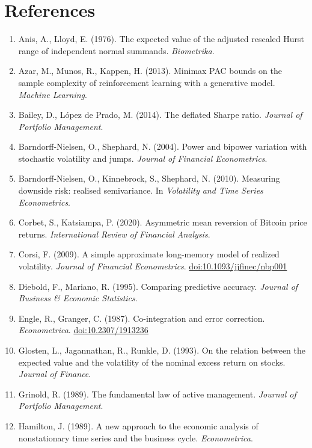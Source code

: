 \documentclass[11pt,a4paper]{article}
\theoremstyle{definition}
\begin{document}
\section*{References}
\small
\begin{enumerate}[leftmargin=18pt,itemsep=1pt]
\item Anis, A., Lloyd, E. (1976). The expected value of the adjusted rescaled Hurst range of independent normal summands. \emph{Biometrika}.
\item Azar, M., Munos, R., Kappen, H. (2013). Minimax PAC bounds on the sample complexity of reinforcement learning with a generative model. \emph{Machine Learning}.
\item Bailey, D., L\'opez de Prado, M. (2014). The deflated Sharpe ratio. \emph{Journal of Portfolio Management}.
\item Barndorff-Nielsen, O., Shephard, N. (2004). Power and bipower variation with stochastic volatility and jumps. \emph{Journal of Financial Econometrics}.
\item Barndorff-Nielsen, O., Kinnebrock, S., Shephard, N. (2010). Measuring downside risk: realised semivariance. In \emph{Volatility and Time Series Econometrics}.
\item Corbet, S., Katsiampa, P. (2020). Asymmetric mean reversion of Bitcoin price returns. \emph{International Review of Financial Analysis}.
\item Corsi, F. (2009). A simple approximate long-memory model of realized volatility. \emph{Journal of Financial Econometrics}. \href{https://doi.org/10.1093/jjfinec/nbp001}{doi:10.1093/jjfinec/nbp001}
\item Diebold, F., Mariano, R. (1995). Comparing predictive accuracy. \emph{Journal of Business \& Economic Statistics}.
\item Engle, R., Granger, C. (1987). Co-integration and error correction. \emph{Econometrica}. \href{https://doi.org/10.2307/1913236}{doi:10.2307/1913236}
\item Glosten, L., Jagannathan, R., Runkle, D. (1993). On the relation between the expected value and the volatility of the nominal excess return on stocks. \emph{Journal of Finance}.
\item Grinold, R. (1989). The fundamental law of active management. \emph{Journal of Portfolio Management}.
\item Hamilton, J. (1989). A new approach to the economic analysis of nonstationary time series and the business cycle. \emph{Econometrica}.

\end{enumerate}
\end{document}
